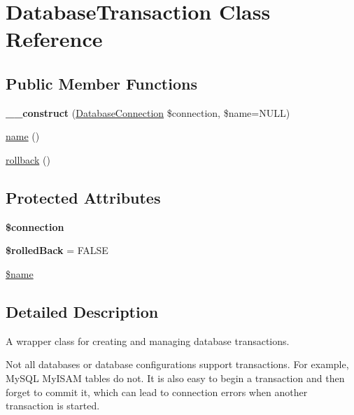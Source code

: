\hypertarget{classDatabaseTransaction}{
\section{DatabaseTransaction Class Reference}
\label{classDatabaseTransaction}
}
\subsection*{Public Member Functions}
\begin{DoxyCompactItemize}
\item 
\hypertarget{classDatabaseTransaction_ac04dd552cd2b3fba44d28716dd158bce}{
{\bfseries \_\-\_\-construct} (\hyperlink{classDatabaseConnection}{DatabaseConnection} \$connection, \$name=NULL)}
\label{classDatabaseTransaction_ac04dd552cd2b3fba44d28716dd158bce}

\item 
\hyperlink{classDatabaseTransaction_ae1a70609e1ea2bb1e3d7e58f7e19e0ed}{name} ()
\item 
\hyperlink{classDatabaseTransaction_a51bdf8ca9423cc331e877dbf43cd6981}{rollback} ()
\end{DoxyCompactItemize}
\subsection*{Protected Attributes}
\begin{DoxyCompactItemize}
\item 
\hypertarget{classDatabaseTransaction_a2dd9c7fc6e8a3cc51ee3b224327d26db}{
{\bfseries \$connection}}
\label{classDatabaseTransaction_a2dd9c7fc6e8a3cc51ee3b224327d26db}

\item 
\hypertarget{classDatabaseTransaction_ab01b1e7c761fae2fbf64a29c5d7ec411}{
{\bfseries \$rolledBack} = FALSE}
\label{classDatabaseTransaction_ab01b1e7c761fae2fbf64a29c5d7ec411}

\item 
\hyperlink{classDatabaseTransaction_a70011229968a0f37f3a2be5ab72d03f6}{\$name}
\end{DoxyCompactItemize}


\subsection{Detailed Description}
A wrapper class for creating and managing database transactions.

Not all databases or database configurations support transactions. For example, MySQL MyISAM tables do not. It is also easy to begin a transaction and then forget to commit it, which can lead to connection errors when another transaction is started.

